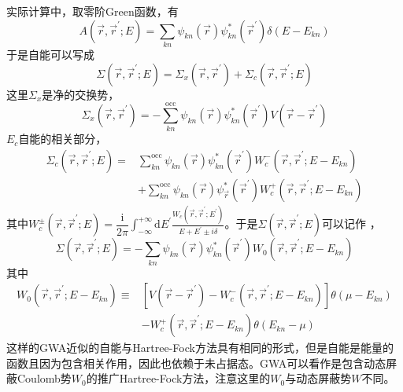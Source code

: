 {实际计算中，取零阶Green函数，有
\begin{equation}
  A(\vec r,\vec r^{\prime};E)=\sum_{kn}\psi_{kn}(\vec r)\psi_{kn}^{\ast}(\vec r^{\prime})\delta(E-E_{kn})
  \label{eq:solid-235}
\end{equation}
于是自能可以写成
\begin{equation}
  \Sigma(\vec r,\vec r^{\prime};E)=\Sigma_x(\vec r,\vec r^{\prime})+\Sigma_c(\vec r,\vec r^{\prime};E)
  \label{eq:solid-236}
\end{equation}
这里$\Sigma_x$是净的交换势，
\begin{equation}
	\Sigma_x(\vec r,\vec r^{\prime})=-\sum_{kn}^{\mathrm{occ}}\psi_{kn}(\vec r)\psi_{kn}^{\ast}(\vec r^{\prime})V(\vec r-\vec r^{\prime})
  \label{eq:solid-254}
\end{equation}
$E_c$自能的相关部分，
\begin{equation}
  \begin{split}
	  \Sigma_c(\vec r,\vec r^{\prime};E)=&\sum_{kn}^{\mathrm{occ}}\psi_{kn}(\vec r)\psi_{kn}^{\ast}(\vec r^{\prime})W_c^-(\vec r,\vec r^{\prime};E-E_{kn})\\
	  &+\sum_{kn}^{\mathrm{occ}}\psi_{kn}(\vec r)\psi_{\vec r}^{\ast}(\vec r^{\prime})W_c^+(\vec r,\vec r^{\prime};E-E_{kn})
  \end{split}
  \label{eq:solid-237}
\end{equation}
其中$W_c^{\pm}(\vec r,\vec r^{\prime};E)=\dfrac{\mathrm{i}}{2\pi}\int_{-\infty}^{+\infty}\mathrm{d}E^{\prime}\frac{W_c(\vec r,\vec r^{\prime};E^{\prime})}{E+E^{\prime}\pm i\delta}$。于是$\Sigma(\vec r,\vec r^{\prime};E)$可以记作%
，
\begin{displaymath}
  \Sigma(\vec r,\vec r^{\prime};E)=-\sum_{kn}\psi_{kn}(\vec r)\psi_{kn}^{\ast}(\vec r^{\prime})W_0(\vec r,\vec r^{\prime};E-E_{kn})
\end{displaymath}
其中
\begin{displaymath}
  \begin{aligned}
    W_0(\vec r,\vec r^{\prime};E-E_{kn})\equiv&[V(\vec r-\vec r^{\prime})-W_c^-(\vec r,\vec r^{\prime};E-E_{kn})]\theta(\mu-E_{kn})\\
    &-W_c^+(\vec r,\vec r^{\prime};E-E_{kn})\theta(E_{kn}-\mu)
  \end{aligned}
\end{displaymath}
这样的GWA近似的自能与Hartree-Fock方法具有相同的形式，但是自能是能量的函数且因为包含相关作用，因此也依赖于未占据态。GWA可以看作是包含动态屏蔽Coulomb势$W_0$的推广Hartree-Fock方法，注意这里的$W_0$与动态屏蔽势$W$不同。

}

